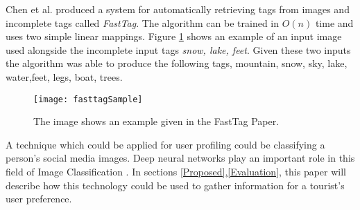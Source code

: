     Chen et al. \cite{Chen2013} produced a system for automatically
    retrieving tags from images and incomplete tags called
    \emph{FastTag}. The algorithm can be trained in \(O(n)\) time and
    uses two simple linear mappings. Figure \ref{fasttag} shows an
    example of an input image used alongside the incomplete input tags
    \emph{snow, lake, feet}. Given these two inputs the algorithm was
    able to produce the following tags, {mountain, snow, sky, lake, water,feet, legs,
    boat, trees}.
    \begin{figure}[H]
        \caption{The image shows an example given in the FastTag
        Paper.\cite{Chen2013}}
        \centering
        \texttt{[image: fasttagSample]}
        \label{fasttag}
    \end{figure}

    A technique which could be applied for user profiling could be
    classifying a person’s social media images. Deep neural networks
    play an important role in this field of Image Classification 
    \cite{Balaji2019,Cufoglu,FrancoisChollet2017}. In sections \ref{Proposed},\ref{Evaluation},
    this paper will describe how this technology could be used to
    gather information for a tourist’s user preference. 

    
